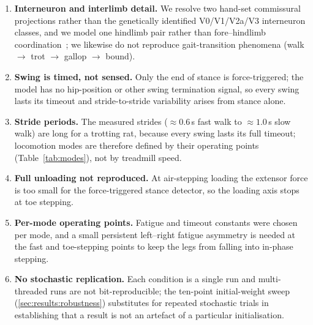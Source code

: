 \begin{enumerate}
  \item \textbf{Interneuron and interlimb detail.} We resolve two hand-set
        commissural projections rather than the genetically identified
        V0/V1/V2a/V3 interneuron classes, and we model one hindlimb pair
        rather than fore--hindlimb coordination~\cite{zhang2022}; we
        likewise do not reproduce gait-transition phenomena
        (walk $\to$ trot $\to$ gallop $\to$ bound).
  \item \textbf{Swing is timed, not sensed.} Only the end of stance is
        force-triggered; the model has no hip-position or other swing
        termination signal, so every swing lasts its timeout and
        stride-to-stride variability arises from stance alone.
  \item \textbf{Stride periods.} The measured strides ($\approx0.6$\,s fast
        walk to $\approx1.0$\,s slow walk) are long for a trotting rat,
        because every swing lasts its full timeout; locomotion modes are
        therefore defined by their operating points (Table~\ref{tab:modes}),
        not by treadmill speed.
  \item \textbf{Full unloading not reproduced.} At air-stepping loading the
        extensor force is too small for the force-triggered stance detector,
        so the loading axis stops at toe stepping.
  \item \textbf{Per-mode operating points.} Fatigue and timeout constants
        were chosen per mode, and a small persistent left--right fatigue
        asymmetry is needed at the fast and toe-stepping points to keep the
        legs from falling into in-phase stepping.
  \item \textbf{No stochastic replication.} Each condition is a single run
        and multi-threaded runs are not bit-reproducible; the ten-point
        initial-weight sweep (\autoref{sec:results:robustness}) substitutes
        for repeated stochastic trials in establishing that a result is not
        an artefact of a particular initialisation.
\end{enumerate}

